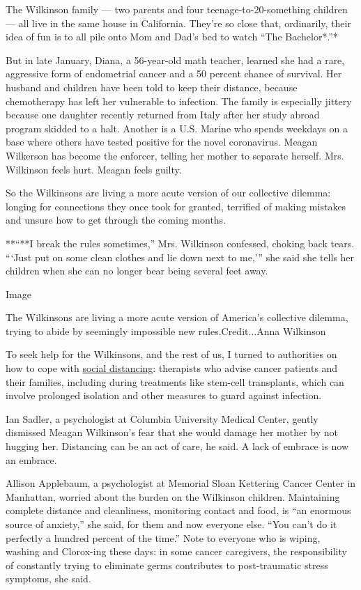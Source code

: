 The Wilkinson family --- two parents and four teenage-to-20-something
children --- all live in the same house in California. They're so close
that, ordinarily, their idea of fun is to all pile onto Mom and Dad's
bed to watch ``The Bachelor*.''*

But in late January, Diana, a 56-year-old math teacher, learned she had
a rare, aggressive form of endometrial cancer and a 50 percent chance of
survival. Her husband and children have been told to keep their
distance, because chemotherapy has left her vulnerable to infection. The
family is especially jittery because one daughter recently returned from
Italy after her study abroad program skidded to a halt. Another is a
U.S. Marine who spends weekdays on a base where others have tested
positive for the novel coronavirus. Meagan Wilkerson has become the
enforcer, telling her mother to separate herself. Mrs. Wilkinson feels
hurt. Meagan feels guilty.

So the Wilkinsons are living a more acute version of our collective
dilemma: longing for connections they once took for granted, terrified
of making mistakes and unsure how to get through the coming months.

**``**I break the rules sometimes,'' Mrs. Wilkinson confessed, choking
back tears. ```Just put on some clean clothes and lie down next to
me,''' she said she tells her children when she can no longer bear being
several feet away.

Image

The Wilkinsons are living a more acute version of America's collective
dilemma, trying to abide by seemingly impossible new rules.Credit...Anna
Wilkinson

To seek help for the Wilkinsons, and the rest of us, I turned to
authorities on how to cope with
\href{https://www.nytimes.com/2020/03/19/well/live/coronavirus-quarantine-social-distancing.html}{social
distancing}: therapists who advise cancer patients and their families,
including during treatments like stem-cell transplants, which can
involve prolonged isolation and other measures to guard against
infection.

Ian Sadler, a psychologist at Columbia University Medical Center, gently
dismissed Meagan Wilkinson's fear that she would damage her mother by
not hugging her. Distancing can be an act of care, he said. A lack of
embrace is now an embrace.

Allison Applebaum, a psychologist at Memorial Sloan Kettering Cancer
Center in Manhattan, worried about the burden on the Wilkinson children.
Maintaining complete distance and cleanliness, monitoring contact and
food, is ``an enormous source of anxiety,'' she said, for them and now
everyone else. ``You can't do it perfectly a hundred percent of the
time.'' Note to everyone who is wiping, washing and Clorox-ing these
days: in some cancer caregivers, the responsibility of constantly trying
to eliminate germs contributes to post-traumatic stress symptoms, she
said.

